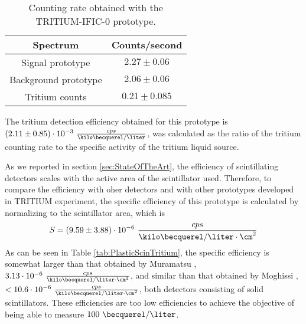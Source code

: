 \begin{table}[htbp]
\centering{}%
\begin{tabular}{cc}
\toprule 
Spectrum & Counts/second \tabularnewline
\midrule
\midrule 
Signal prototype & $2.27 \pm 0.06$ \tabularnewline
Background prototype & $2.06 \pm 0.06$ \tabularnewline  
Tritium counts & $0.21 \pm 0.085$ \tabularnewline
\bottomrule
\end{tabular}
\caption{Counting rate obtained with the TRITIUM-IFIC-0 prototype.}
\label{tab:CountsPerSecondTRITIUMIFIC0}
\end{table}

The tritium detection efficiency obtained for this prototype is $(2.11 \pm 0.85)\cdot{} 10^{-3}~\frac{cps}{\kilo\becquerel/\liter}$, was calculated as the ratio of the tritium counting rate to the specific activity of the tritium liquid source. 

As we reported in section \ref{sec:StateOfTheArt}, the efficiency of scintillating detectors scales with the active area of the scintillator used. Therefore, to compare the efficiency with oher detectors and with other prototypes developed in TRITIUM experiment, the specific efficiency of this prototype is calculated by normalizing to the scintillator area, which is 
$$S = (9.59 \pm 3.88)\cdot{} 10^{-6}~\frac{cps}{\kilo\becquerel/\liter \cdot{} \cm^{2}}$$
As can be seen in Table \ref{tab:PlasticScinTritium}, the specific efficiency is somewhat larger than that obtained by Muramatsu \cite{Muramatsu}, $3.13 \cdot{} 10^{-6}~\frac{cps}{\kilo\becquerel/\liter \cdot{} \cm^{2}}$, and similar than that obtained by Moghissi \cite{Moghissi}, $ <10.6 \cdot{} 10^{-6}~\frac{cps}{\kilo\becquerel/\liter \cdot{} \cm^{2}}$, both detectors consisting of solid scintillators. These efficiencies are too low efficiencies to achieve the objective of being able to measure $100~\becquerel/\liter$. 







